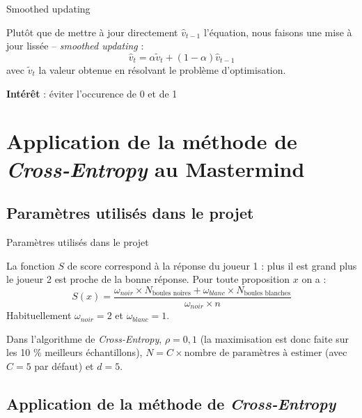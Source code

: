 \documentclass[10pt,xcolor=table,color={dvipsnames,usenames},ignorenonframetext,usepdftitle=false,french]{beamer}
\begin{document}
\begin{frame}{Smoothed updating}
\protect\hypertarget{smoothed-updating}{}

Plutôt que de mettre à jour directement \(\hat{v}_{t-1}\) l'équation,
nous faisons une mise à jour lissée -- \emph{smoothed updating} : \[
\hat{v}_{t}=\alpha\tilde{v}_{t}+(1-\alpha)\hat{v}_{t-1}
\] avec \(\tilde{v}_{t}\) la valeur obtenue en résolvant le problème
d'optimisation.

\textbf{Intérêt} : éviter l'occurence de 0 et de 1

\end{frame}

\hypertarget{sec:q1}{%
\section{\texorpdfstring{Application de la méthode de
\emph{Cross-Entropy} au
Mastermind}{Application de la méthode de Cross-Entropy au Mastermind}}\label{sec:q1}}

\hypertarget{paramuxe8tres-utilisuxe9s-dans-le-projet}{%
\subsection{Paramètres utilisés dans le
projet}\label{paramuxe8tres-utilisuxe9s-dans-le-projet}}

\begin{frame}{Paramètres utilisés dans le projet}
\protect\hypertarget{paramuxe8tres-utilisuxe9s-dans-le-projet-1}{}

La fonction \(S\) de score correspond à la réponse du joueur 1 : plus il
est grand plus le joueur 2 est proche de la bonne réponse. Pour toute
proposition \(x\) on a : \[
S(x)=\frac{\omega_{noir}\times N_{\text{boules noires}}+\omega_{blanc}\times N_{\text{boules blanches}}
}{
\omega_{noir}\times n
}
\] Habituellement \(\omega_{noir}=2\) et \(\omega_{blanc}=1\).

Dans l'algorithme de \emph{Cross-Entropy}, \(\rho = 0,1\) (la
maximisation est donc faite sur les 10 \% meilleurs échantillons),
\(N = C\times\text{nombre de paramètres à estimer}\) (avec \(C=5\) par
défaut) et \(d=5\).

\end{frame}

\hypertarget{application-de-la-muxe9thode-de-cross-entropy}{%
\subsection{\texorpdfstring{Application de la méthode de
\emph{Cross-Entropy}}{Application de la méthode de Cross-Entropy}}\label{application-de-la-muxe9thode-de-cross-entropy}}
\end{document}
